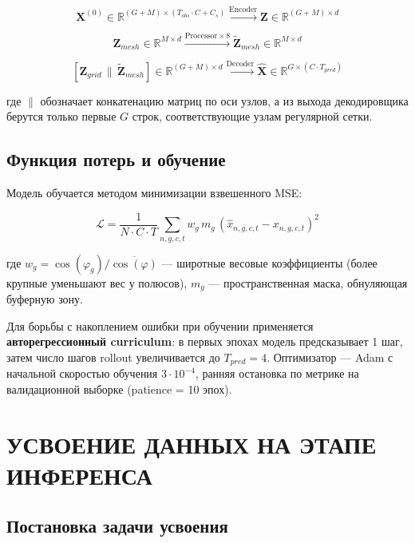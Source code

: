 \documentclass[14pt,a4paper]{extarticle}
\numberwithin{table}{section}
\numberwithin{figure}{section}
\numberwithin{equation}{section}
\begin{document}
\[\mathbf{X}^{(0)} \in \mathbb{R}^{(G+M)\times(T_{obs}\cdot C + C_s)} \xrightarrow{\text{Encoder}} \mathbf{Z} \in \mathbb{R}^{(G+M)\times d}\]

\[\mathbf{Z}_{mesh} \in \mathbb{R}^{M\times d} \xrightarrow{\text{Processor}\times 8} \tilde{\mathbf{Z}}_{mesh} \in \mathbb{R}^{M\times d}\]

\[[\mathbf{Z}_{grid} \,\|\, \tilde{\mathbf{Z}}_{mesh}] \in \mathbb{R}^{(G+M)\times d} \xrightarrow{\text{Decoder}} \hat{\mathbf{X}} \in \mathbb{R}^{G\times (C\cdot T_{pred})}\]

где \(\|\) обозначает конкатенацию матриц по оси узлов, а из выхода
декодировщика берутся только первые \(G\) строк, соответствующие узлам
регулярной сетки.

\subsection{Функция потерь и обучение}\label{ux444ux443ux43dux43aux446ux438ux44f-ux43fux43eux442ux435ux440ux44c-ux438-ux43eux431ux443ux447ux435ux43dux438ux435}

Модель обучается методом минимизации взвешенного MSE:

\[\mathcal{L} = \frac{1}{N \cdot C \cdot T} \sum_{n,g,c,t} w_g \, m_g \, \left(\hat{x}_{n,g,c,t} - x_{n,g,c,t}\right)^2\]

где \(w_g = \cos(\varphi_g) / \overline{\cos(\varphi)}\) --- широтные
весовые коэффициенты (более крупные уменьшают вес у полюсов), \(m_g\)
--- пространственная маска, обнуляющая буферную зону.

Для борьбы с накоплением ошибки при обучении применяется
\textbf{авторегрессионный curriculum}: в первых эпохах модель
предсказывает 1 шаг, затем число шагов rollout увеличивается до
\(T_{pred} = 4\). Оптимизатор --- Adam с начальной скоростью обучения
\(3 \cdot 10^{-4}\), ранняя остановка по метрике на валидационной
выборке (patience = 10 эпох).


\newpage

\section{УСВОЕНИЕ ДАННЫХ НА ЭТАПЕ ИНФЕРЕНСА}\label{ux443ux441ux432ux43eux435ux43dux438ux435-ux434ux430ux43dux43dux44bux445-ux43dux430-ux44dux442ux430ux43fux435-ux438ux43dux444ux435ux440ux435ux43dux441ux430}

\subsection{Постановка задачи усвоения}\label{ux43fux43eux441ux442ux430ux43dux43eux432ux43aux430-ux437ux430ux434ux430ux447ux438-ux443ux441ux432ux43eux435ux43dux438ux44f}
\end{document}
